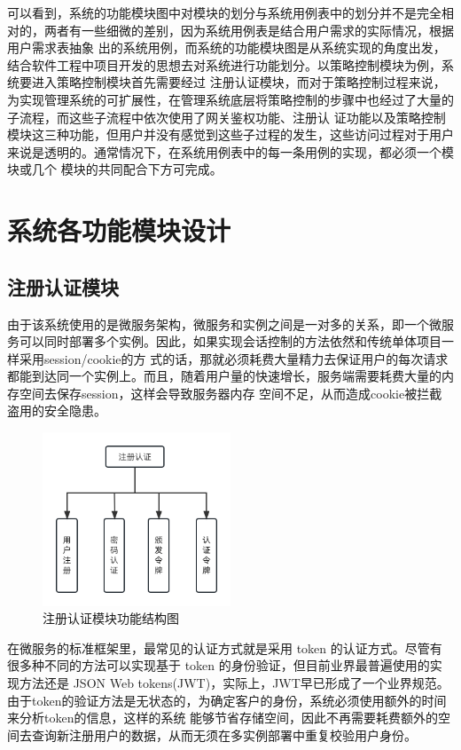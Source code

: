 可以看到，系统的功能模块图中对模块的划分与系统用例表中的划分并不是完全相对的，两者有一些细微的差别，因为系统用例表是结合用户需求的实际情况，根据用户需求表抽象
出的系统用例，而系统的功能模块图是从系统实现的角度出发，结合软件工程中项目开发的思想去对系统进行功能划分。以策略控制模块为例，系统要进入策略控制模块首先需要经过
注册认证模块，而对于策略控制过程来说，为实现管理系统的可扩展性，在管理系统底层将策略控制的步骤中也经过了大量的子流程，而这些子流程中依次使用了网关鉴权功能、注册认
证功能以及策略控制模块这三种功能，但用户并没有感觉到这些子过程的发生，这些访问过程对于用户来说是透明的。通常情况下，在系统用例表中的每一条用例的实现，都必须一个模块或几个
模块的共同配合下方可完成。

\section{系统各功能模块设计}

\subsection{注册认证模块}

由于该系统使用的是微服务架构，微服务和实例之间是一对多的关系，即一个微服务可以同时部署多个实例。因此，如果实现会话控制的方法依然和传统单体项目一样采用session/cookie的方
式的话，那就必须耗费大量精力去保证用户的每次请求都能到达同一个实例上。而且，随着用户量的快速增长，服务端需要耗费大量的内存空间去保存session，这样会导致服务器内存
空间不足，从而造成cookie被拦截盗用的安全隐患。

\begin{figure}[h]
    \centering
    \includegraphics[width=0.5\textwidth]{my_figures/chapter4/注册认证模块功能结构图.png}
    \caption{注册认证模块功能结构图}
    \label{fig:注册认证模块功能结构图}
\end{figure}

在微服务的标准框架里，最常见的认证方式就是采用 token 的认证方式。尽管有很多种不同的方法可以实现基于 token 的身份验证，但目前业界最普遍使用的实现方法还是
JSON Web tokens(JWT)，实际上，JWT早已形成了一个业界规范。由于token的验证方法是无状态的，为确定客户的身份，系统必须使用额外的时间来分析token的信息，这样的系统
能够节省存储空间，因此不再需要耗费额外的空间去查询新注册用户的数据，从而无须在多实例部署中重复校验用户身份。

